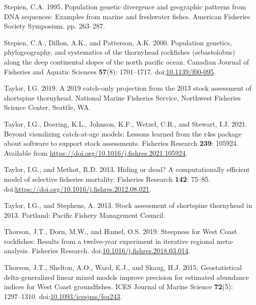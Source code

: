 \documentclass[11pt,
  english,
  letterpaper,
]{article}
\newlength{\cslhangindent}
\newenvironment{CSLReferences}[2] %
 {%
  \setlength{\parindent}{0pt}
  \ifodd #1 \everypar{\setlength{\hangindent}{\cslhangindent}}\ignorespaces\fi
  \ifnum #2 > 0
  \setlength{\parskip}{#2\baselineskip}
  \fi
 }%
 {}
\begin{document}
\begin{CSLReferences}{1}{0}
\leavevmode{}%
Stepien, C.A. 1995. Population genetic divergence and geographic patterns from DNA sequences: Examples from marine and freshwater fishes. American Fisheries Society Symposium. pp. 263--287.

\leavevmode{}%
Stepien, C.A., Dillon, A.K., and Patterson, A.K. 2000. Population genetics, phylogeography, and systematics of the thornyhead rockfishes (sebastolobus) along the deep continental slopes of the north pacific ocean. Canadian Journal of Fisheries and Aquatic Sciences \textbf{57}(8): 1701--1717. doi:\href{https://doi.org/10.1139/f00-095}{10.1139/f00-095}.

\leavevmode{}%
Taylor, I.G. 2019. A 2019 catch-only projection from the 2013 stock assessment of shortspine thornyhead. National Marine Fisheries Service, Northwest Fisheries Science Center, Seattle, {WA}.

\leavevmode{}%
Taylor, I.G., Doering, K.L., Johnson, K.F., Wetzel, C.R., and Stewart, I.J. 2021. Beyond visualizing catch-at-age models: Lessons learned from the r4ss package about software to support stock assessments. Fisheries Research \textbf{239}: 105924. Available from \url{https://doi.org/10.1016/j.fishres.2021.105924}.

\leavevmode{}%
Taylor, I.G., and Methot, R.D. 2013. Hiding or dead? A computationally efficient model of selective fisheries mortality. Fisheries Research \textbf{142}: 75--85. doi:\url{https://doi.org/10.1016/j.fishres.2012.08.021}.

\leavevmode{}%
Taylor, I.G., and Stephens, A. 2013. Stock assessment of shortspine thornyhead in 2013. Portland: Pacific Fishery Management Council.

\leavevmode{}%
Thorson, J.T., Dorn, M.W., and Hamel, O.S. 2019. Steepness for {West} {Coast} rockfishes: {Results} from a twelve-year experiment in iterative regional meta-analysis. Fisheries Research. doi:\href{https://doi.org/10.1016/j.fishres.2018.03.014}{10.1016/j.fishres.2018.03.014}.

\leavevmode{}%
Thorson, J.T., Shelton, A.O., Ward, E.J., and Skaug, H.J. 2015. {Geostatistical delta-generalized linear mixed models improve precision for estimated abundance indices for West Coast groundfishes}. ICES Journal of Marine Science \textbf{72}(5): 1297--1310. doi:\href{https://doi.org/10.1093/icesjms/fsu243}{10.1093/icesjms/fsu243}.


\end{CSLReferences}
\end{document}
